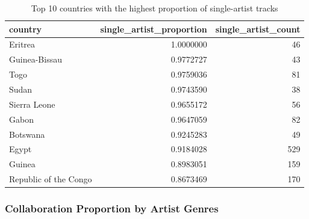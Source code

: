 \documentclass{article}
\begin{document}
\begin{table}[H]
    \centering
    \begin{tabular}[t]{lrr}
        \toprule
        country               & single\_artist\_proportion & single\_artist\_count \\
        \midrule
        Eritrea               & 1.0000000                  & 46                    \\
        Guinea-Bissau         & 0.9772727                  & 43                    \\
        Togo                  & 0.9759036                  & 81                    \\
        Sudan                 & 0.9743590                  & 38                    \\
        Sierra Leone          & 0.9655172                  & 56                    \\
        Gabon                 & 0.9647059                  & 82                    \\
        Botswana              & 0.9245283                  & 49                    \\
        Egypt                 & 0.9184028                  & 529                   \\
        Guinea                & 0.8983051                  & 159                   \\
        Republic of the Congo & 0.8673469                  & 170                   \\
        \bottomrule
    \end{tabular}
    \caption{Top 10 countries with the highest proportion of single-artist tracks}\label{tab:top_single_countries}
\end{table}

\subsubsection{Collaboration Proportion by Artist Genres}
\end{document}
